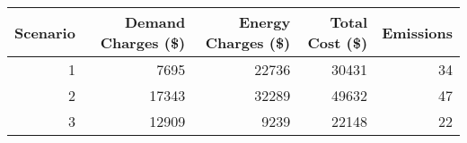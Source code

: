 \begin{tabular}{rrrrr}
\toprule
 Scenario &  Demand Charges (\$) &  Energy Charges (\$) &  Total Cost (\$) &  Emissions \\
\midrule
        1 &                7695 &               22736 &           30431 &         34 \\
        2 &               17343 &               32289 &           49632 &         47 \\
        3 &               12909 &                9239 &           22148 &         22 \\
\bottomrule
\end{tabular}
